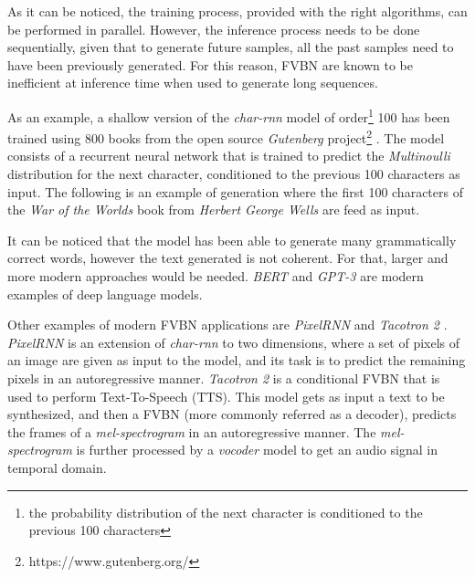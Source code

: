 As it can be noticed, the training process, provided with the right algorithms, can be performed in parallel. However, the inference process needs to be done sequentially, given that to generate future samples, all the past samples need to have been previously generated. For this reason, FVBN are known to be inefficient at inference time when used to generate long sequences.

As an example, a shallow version of the \textit{char-rnn} model of order\footnote{the probability distribution of the next character is conditioned to the previous 100 characters} 100 has been trained using 800 books from the open source \textit{Gutenberg} project\footnote{https://www.gutenberg.org/} \autocite{gerlach2020}. The model consists of a recurrent neural network that is trained to predict the \textit{Multinoulli} distribution for the next character, conditioned to the previous 100 characters as input. The following is an example of generation where the first 100 characters of the \textit{War of the Worlds} book from \textit{Herbert George Wells} are feed as input.


It can be noticed that the model has been able to generate many grammatically correct words, however the text generated is not coherent. For that, larger and more modern approaches would be needed. \textit{BERT} \autocite{davlin2019} and \textit{GPT-3} \autocite{floridi2020} are modern examples of deep language models.

Other examples of modern FVBN applications are \textit{PixelRNN} and \textit{Tacotron 2} \autocite{Wang2017,Shen2018,liu2019b}. \textit{PixelRNN} \autocite{Oord2016, Oord2016b} is an extension of \textit{char-rnn} to two dimensions, where a set of pixels of an image are given as input to the model, and its task is to predict the remaining pixels in an autoregressive manner. \textit{Tacotron 2} is a conditional FVBN that is used to perform Text-To-Speech (TTS). This model gets as input a text to be synthesized, and then a FVBN (more commonly referred as a decoder), predicts the frames of a \textit{mel-spectrogram} in an autoregressive manner. The \textit{mel-spectrogram} is further processed by a \textit{vocoder} model \autocite{vanderoord2016, lorenzotrueba2019} to get an audio signal in temporal domain.

